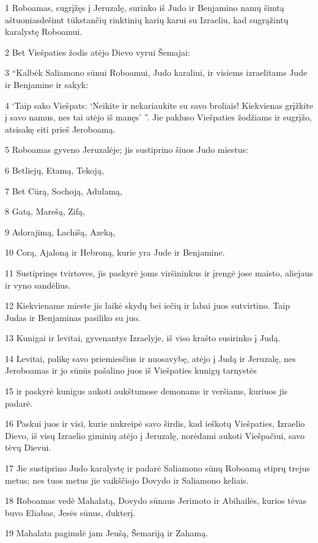 \par 1 Roboamas, sugrįžęs į Jeruzalę, surinko iš Judo ir Benjamino namų šimtą aštuoniasdešimt tūkstančių rinktinių karių karui su Izraeliu, kad sugrąžintų karalystę Roboamui. 
\par 2 Bet Viešpaties žodis atėjo Dievo vyrui Šemajai: 
\par 3 “Kalbėk Saliamono sūnui Roboamui, Judo karaliui, ir visiems izraelitams Jude ir Benjamine ir sakyk: 
\par 4 ‘Taip sako Viešpats: ‘Neikite ir nekariaukite su savo broliais! Kiekvienas grįžkite į savo namus, nes tai atėjo iš manęs’ ”. Jie pakluso Viešpaties žodžiams ir sugrįžo, atsisakę eiti prieš Jeroboamą. 
\par 5 Roboamas gyveno Jeruzalėje; jis sustiprino šiuos Judo miestus: 
\par 6 Betliejų, Etamą, Tekoją, 
\par 7 Bet Cūrą, Sochoją, Adulamą, 
\par 8 Gatą, Marešą, Zifą, 
\par 9 Adorajimą, Lachišą, Azeką, 
\par 10 Corą, Ajaloną ir Hebroną, kurie yra Jude ir Benjamine. 
\par 11 Sustiprinęs tvirtoves, jis paskyrė joms viršininkus ir įrengė jose maisto, aliejaus ir vyno sandėlius. 
\par 12 Kiekviename mieste jis laikė skydų bei iečių ir labai juos sutvirtino. Taip Judas ir Benjaminas pasiliko su juo. 
\par 13 Kunigai ir levitai, gyvenantys Izraelyje, iš viso krašto susirinko į Judą. 
\par 14 Levitai, palikę savo priemiesčius ir nuosavybę, atėjo į Judą ir Jeruzalę, nes Jeroboamas ir jo sūnūs pašalino juos iš Viešpaties kunigų tarnystės 
\par 15 ir paskyrė kunigus aukoti aukštumose demonams ir veršiams, kuriuos jis padarė. 
\par 16 Paskui juos ir visi, kurie nukreipė savo širdis, kad ieškotų Viešpaties, Izraelio Dievo, iš visų Izraelio giminių atėjo į Jeruzalę, norėdami aukoti Viešpačiui, savo tėvų Dievui. 
\par 17 Jie sustiprino Judo karalystę ir padarė Saliamono sūnų Roboamą stiprų trejus metus; nes tuos metus jie vaikščiojo Dovydo ir Saliamono keliais. 
\par 18 Roboamas vedė Mahalatą, Dovydo sūnaus Jerimoto ir Abihailės, kurios tėvas buvo Eliabas, Jesės sūnus, dukterį. 
\par 19 Mahalata pagimdė jam Jeušą, Šemariją ir Zahamą. 
